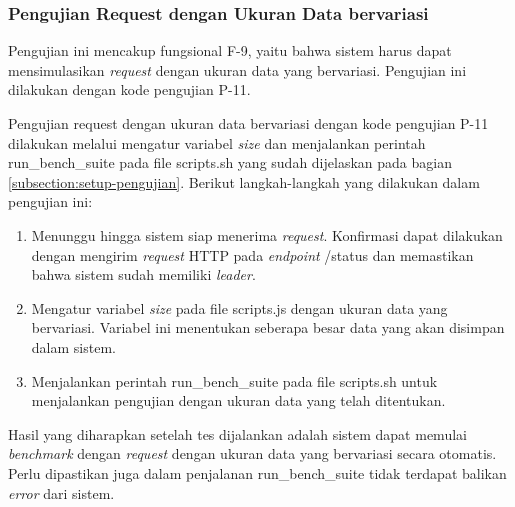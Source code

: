 \subsubsection{Pengujian Request dengan Ukuran Data bervariasi}
\label{subsubsection:pengujian-request-ukuran-data}

Pengujian ini mencakup fungsional F-9, yaitu bahwa sistem harus dapat mensimulasikan \textit{request} dengan ukuran data yang bervariasi. Pengujian ini dilakukan dengan kode pengujian P-11.

Pengujian request dengan ukuran data bervariasi dengan kode pengujian P-11 dilakukan melalui mengatur variabel \textit{size} dan menjalankan perintah run\_bench\_suite pada file scripts.sh yang sudah dijelaskan pada bagian \ref{subsection:setup-pengujian}. Berikut langkah-langkah yang dilakukan dalam pengujian ini:

\begin{enumerate}
    \item Menunggu hingga sistem siap menerima \textit{request}. Konfirmasi dapat dilakukan dengan mengirim \textit{request} HTTP pada \textit{endpoint} /status dan memastikan bahwa sistem sudah memiliki \textit{leader}.
    \item Mengatur variabel \textit{size} pada file scripts.js dengan ukuran data yang bervariasi. Variabel ini menentukan seberapa besar data yang akan disimpan dalam sistem.
    \item Menjalankan perintah run\_bench\_suite pada file scripts.sh untuk menjalankan pengujian dengan ukuran data yang telah ditentukan.
\end{enumerate}

Hasil yang diharapkan setelah tes dijalankan adalah sistem dapat memulai \textit{benchmark} dengan \textit{request} dengan ukuran data yang bervariasi secara otomatis. Perlu dipastikan juga dalam penjalanan run\_bench\_suite tidak terdapat balikan \textit{error} dari sistem.